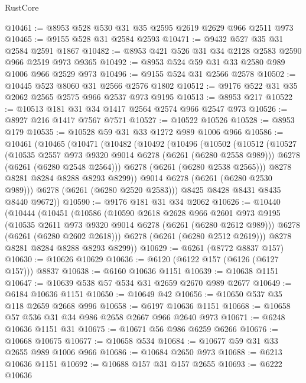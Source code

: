 \begin{lexlean}{RustCore}
\begin{coremodule}
@10461 := @8953 @528 @530 @31 @35 @2595 @2619 @2629 @966 @2511 @973
@10465 := @9155 @528 @31 @2584 @2593
@10471 := @9432 @527 @35 @31 @2584 @2591 @1867
@10482 := @8953 @421 @526 @31 @34 @2128 @2583 @2590 @966 @2519 @973 @9365
@10492 := @8953 @524 @59 @31 @33 @2580 @989 @1006 @966 @2529 @973
@10496 := @9155 @524 @31 @2566 @2578
@10502 := @10445 @523 @8060 @31 @2566 @2576 @1802
@10512 := @9176 @522 @31 @35 @2062 @2565 @2575 @966 @2537 @973 @9195
@10513 := @8953 @217
@10522 := @10513 @181 @31 @34 @1417 @2564 @2574 @966 @2547 @973
@10526 := @8927 @216 @1417 @7567 @7571
@10527 := @10522 @10526
@10528 := @8953 @179
@10535 := @10528 @59 @31 @33 @1272 @989 @1006 @966
@10586 := @10461
    (@10465
      (@10471
        (@10482
          (@10492
            (@10496
              (@10502
                (@10512
                  (@10527
                    (@10535 @2557 @973 @9320 @9014 @6278 (@6261 (@6280 @2558 @989)))
                    @6278
                    (@6261 (@6280 @2548 @2564)))
                  @6278
                  (@6261 (@6280 @2538 @2565)))
                @8278
                @8281
                @8284
                @8288
                @8293
                @8299))
            @9014
            @6278
            (@6261 (@6280 @2530 @989)))
          @6278
          (@6261 (@6280 @2520 @2583)))
        @8425
        @8428
        @8431
        @8435
        @8440
        @9672))
@10590 := @9176 @181 @31 @34 @2062
@10626 := @10440
    (@10444
      (@10451
        (@10586
          (@10590
            @2618
            @2628
            @966
            @2601
            @973
            @9195
            (@10535 @2611 @973 @9320 @9014 @6278 (@6261 (@6280 @2612 @989)))
            @6278
            (@6261 (@6280 @2602 @2618)))
          @6278
          (@6261 (@6280 @2512 @2619)))
        @8278
        @8281
        @8284
        @8288
        @8293
        @8299))
@10629 := @6261 (@8772 @8837 @157)
@10630 := @10626 @10629
@10636 := @6120 (@6122 @157 (@6126 (@6127 @157))) @8837
@10638 := @6160 @10636 @1151
@10639 := @10638 @1151
@10647 := @10639 @538 @57 @534 @31 @2659 @2670 @989 @2677
@10649 := @6184 @10636 @1151
@10650 := @10649 @42
@10656 := @10650 @537 @35 @118 @2659 @2668 @996
@10658 := @6197 @10636 @1151
@10668 := @10658 @57 @536 @31 @34 @986 @2658 @2667 @966 @2640 @973
@10671 := @6248 @10636 @1151 @31
@10675 := @10671 @56 @986 @6259 @6266
@10676 := @10668 @10675
@10677 := @10658 @534
@10684 := @10677 @59 @31 @33 @2655 @989 @1006 @966
@10686 := @10684 @2650 @973
@10688 := @6213 @10636 @1151
@10692 := @10688 @157 @31 @157 @2655
@10693 := @6222 @10636

\end{coremodule}
\end{lexlean}
